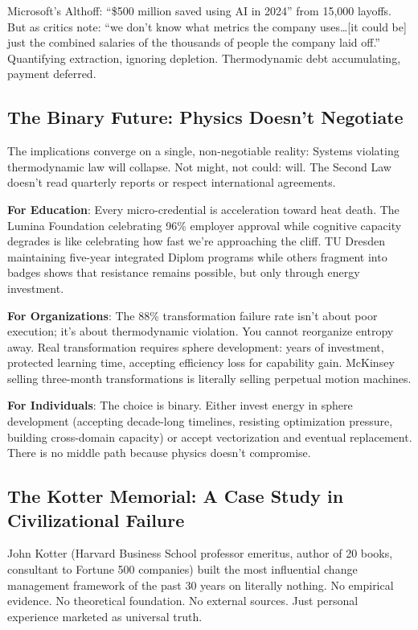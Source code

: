 Microsoft's Althoff: ``\$500 million saved using AI in 2024'' from 15,000 layoffs. But as critics note: ``we don't know what metrics the company uses\ldots [it could be] just the combined salaries of the thousands of people the company laid off.'' Quantifying extraction, ignoring depletion. Thermodynamic debt accumulating, payment deferred.

\subsection{The Binary Future: Physics Doesn't Negotiate}

The implications converge on a single, non-negotiable reality: Systems violating thermodynamic law will collapse. Not might, not could: will. The Second Law doesn't read quarterly reports or respect international agreements.

\textbf{For Education}: Every micro-credential is acceleration toward heat death. The Lumina Foundation celebrating 96\% employer approval while cognitive capacity degrades is like celebrating how fast we're approaching the cliff. TU Dresden maintaining five-year integrated Diplom programs while others fragment into badges shows that resistance remains possible, but only through energy investment.

\textbf{For Organizations}: The 88\% transformation failure rate \citep{bain2024} isn't about poor execution; it's about thermodynamic violation. You cannot reorganize entropy away. Real transformation requires sphere development: years of investment, protected learning time, accepting efficiency loss for capability gain. McKinsey selling three-month transformations is literally selling perpetual motion machines.

\textbf{For Individuals}: The choice is binary. Either invest energy in sphere development (accepting decade-long timelines, resisting optimization pressure, building cross-domain capacity) or accept vectorization and eventual replacement. There is no middle path because physics doesn't compromise.

\subsection{The Kotter Memorial: A Case Study in Civilizational Failure}

John Kotter (Harvard Business School professor emeritus, author of 20 books, consultant to Fortune 500 companies) built the most influential change management framework of the past 30 years on literally nothing. No empirical evidence. No theoretical foundation. No external sources. Just personal experience marketed as universal truth.


